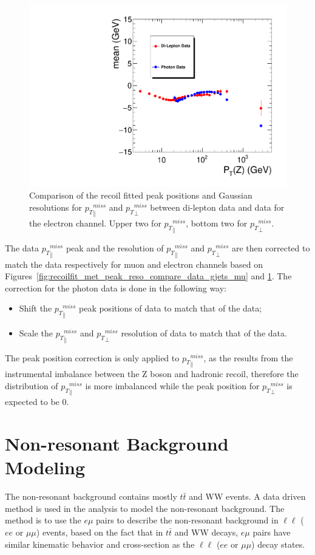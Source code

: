 \begin{figure}[htbp]
\begin{center}
\includegraphics[width=0.46\linewidth, page=7]{figures/plots_SingleEMU_Run2016Full_03Feb2017_allcorV2_met_para_study_ZSelecLowLPt_el_VS_SinglePhoton_Run2016Full_03Feb2017_allcorV2_NoRecoil_met_para_study_ZSelecLowLPt_el.pdf}
\caption{Comparison of the recoil fitted peak positions and Gaussian resolutions for ${p_{T}}^{miss}_\parallel$ and ${p_{T}}^{miss}_\perp$ between di-lepton data and \gjets data for the electron channel. Upper two for 
${p_{T}}^{miss}_\parallel$, bottom two for ${p_{T}}^{miss}_\perp$.}
\label{fig:recoilfit_met_peak_reso_compare_data_gjets_el}
\end{center}
\end{figure}

The \gjets data ${p_{T}}^{miss}_\parallel$ peak and the resolution of ${p_{T}}^{miss}_\parallel$ and ${p_{T}}^{miss}_\perp$ are then corrected to match the \Zjets data respectively for muon and electron channels based on Figures~\ref{fig:recoilfit_met_peak_reso_compare_data_gjets_mu} and \ref{fig:recoilfit_met_peak_reso_compare_data_gjets_el}. The correction for the photon data is done in the following way:
\begin{itemize}
\item Shift the ${p_{T}}^{miss}_\parallel$ peak positions of \gjets data to match that of the \Zjets data;
\item Scale the ${p_{T}}^{miss}_\parallel$ and ${p_{T}}^{miss}_\perp$ resolution of \gjets data to match that of the \Zjets data.
\end{itemize}

The peak position correction is only applied to ${p_{T}}^{miss}_\parallel$, as the \ptmiss results from the instrumental imbalance between the Z boson and hadronic recoil, therefore the distribution of ${p_{T}}^{miss}_\parallel$ is more imbalanced while the peak position for ${p_{T}}^{miss}_\perp$ is expected to be 0.

\clearpage
\section{Non-resonant Background Modeling}
The non-resonant background contains mostly $t\bar{t}$ and WW events. A data driven method is used in the analysis to model the non-resonant background. The method is to use the $e\mu$ pairs to describe the non-resonant background in $\ell\ell$ ($ee$ or $\mu \mu$) events, based on the fact that in $t\bar{t}$ and WW decays, $e\mu$ pairs have similar kinematic behavior and cross-section as the $\ell\ell$ ($ee$ or $\mu \mu$) decay states.

